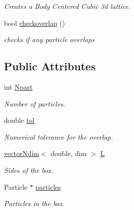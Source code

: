\begin{CompactItemize}
\begin{CompactList}\small\item\em Creates a Body Centered Cubic 3d lattice. \item\end{CompactList}\item 
\hypertarget{classSimBox_aefdb92709a7ffeb969979c46e0dff0b}{
bool \hyperlink{classSimBox_aefdb92709a7ffeb969979c46e0dff0b}{checkoverlap} ()}
\label{classSimBox_aefdb92709a7ffeb969979c46e0dff0b}

\begin{CompactList}\small\item\em checks if any particle overlaps \item\end{CompactList}\end{CompactItemize}
\subsection*{Public Attributes}
\begin{CompactItemize}
\item 
\hypertarget{classSimBox_4960d1a2d759d2d3f8931d9525b5a8fe}{
int \hyperlink{classSimBox_4960d1a2d759d2d3f8931d9525b5a8fe}{Npart}}
\label{classSimBox_4960d1a2d759d2d3f8931d9525b5a8fe}

\begin{CompactList}\small\item\em Number of particles. \item\end{CompactList}\item 
\hypertarget{classSimBox_79606ff5d5b043c9d4cc500a98acdac9}{
double \hyperlink{classSimBox_79606ff5d5b043c9d4cc500a98acdac9}{tol}}
\label{classSimBox_79606ff5d5b043c9d4cc500a98acdac9}

\begin{CompactList}\small\item\em Numerical tolerance for the overlap. \item\end{CompactList}\item 
\hypertarget{classSimBox_d3506a95831b4684b115f33136119ae9}{
\hyperlink{classvectorNdim}{vectorNdim}$<$ double, dim $>$ \hyperlink{classSimBox_d3506a95831b4684b115f33136119ae9}{L}}
\label{classSimBox_d3506a95831b4684b115f33136119ae9}

\begin{CompactList}\small\item\em Sides of the box. \item\end{CompactList}\item 
\hypertarget{classSimBox_aef9a13c9aad3922f3289273b6ad8546}{
Particle $\ast$ \hyperlink{classSimBox_aef9a13c9aad3922f3289273b6ad8546}{particles}}
\label{classSimBox_aef9a13c9aad3922f3289273b6ad8546}

\begin{CompactList}\small\item\em Particles in the box. \item\end{CompactList}\end{CompactItemize}


